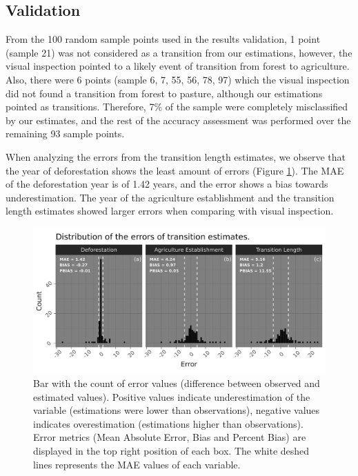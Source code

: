 \documentclass[essd, manuscript]{copernicus}
\begin{document}
\subsection{Validation}

From the 100 random sample points used in the results validation, 1 point (sample 21) was not considered as a transition from our estimations, however, the visual inspection pointed to a likely event of transition from forest to agriculture.
Also, there were 6 points (sample 6, 7, 55, 56, 78, 97) which the visual inspection did not found a transition from forest to pasture, although our estimations pointed as transitions.
Therefore, 7\% of the sample were completely misclassified by our estimates, and the rest of the accuracy assessment was performed over the remaining 93 sample points.

When analyzing the errors from the transition length estimates, we observe that the year of deforestation shows the least amount of errors (Figure \ref{fig:errorbar-plot}).
The MAE of the deforestation year is of 1.42 years, and the error shows a bias towards underestimation.
The year of the agriculture establishment and the transition length estimates showed larger errors when comparing with visual inspection.

\begin{figure}[ht]
\includegraphics[width=17cm]{figs/error_bars} \caption{Bar with the count of error values (difference between observed and estimated values). Positive values indicate underestimation of the variable (estimations were lower than observations), negative values indicates overestimation (estimations higher than observations). Error metrics (Mean Absolute Error, Bias and Percent Bias) are displayed in the top right position of each box. The white deshed lines represents the MAE values of each variable.}\label{fig:errorbar-plot}
\end{figure}
\end{document}

